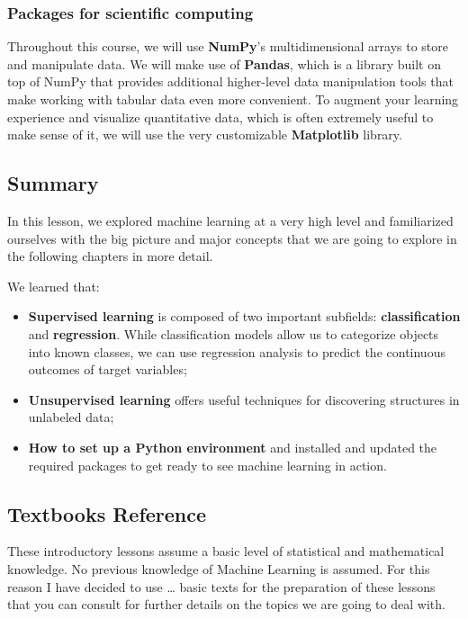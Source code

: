 \documentclass[11pt]{article}
\begin{document}
    \hypertarget{packages-for-scientific-computing}{%
\subsubsection{Packages for scientific
computing}\label{packages-for-scientific-computing}}

Throughout this course, we will use \textbf{NumPy}'s multidimensional
arrays to store and manipulate data. We will make use of
\textbf{Pandas}, which is a library built on top of NumPy that provides
additional higher-level data manipulation tools that make working with
tabular data even more convenient. To augment your learning experience
and visualize quantitative data, which is often extremely useful to make
sense of it, we will use the very customizable \textbf{Matplotlib}
library.

    \hypertarget{summary}{%
\subsection{Summary}\label{summary}}

In this lesson, we explored machine learning at a very high level and
familiarized ourselves with the big picture and major concepts that we
are going to explore in the following chapters in more detail.

We learned that:

\begin{itemize}
\item
  \textbf{Supervised learning} is composed of two important subfields:
  \textbf{classification} and \textbf{regression}. While classification
  models allow us to categorize objects into known classes, we can use
  regression analysis to predict the continuous outcomes of target
  variables;
\item
  \textbf{Unsupervised learning} offers useful techniques for
  discovering structures in unlabeled data;
\item
  \textbf{How to set up a Python environment} and installed and updated
  the required packages to get ready to see machine learning in action.
\end{itemize}

    \hypertarget{textbooks-reference}{%
\subsection{Textbooks Reference}\label{textbooks-reference}}

These introductory lessons assume a basic level of statistical and
mathematical knowledge. No previous knowledge of Machine Learning is
assumed. For this reason I have decided to use \ldots{} basic texts for
the preparation of these lessons that you can consult for further
details on the topics we are going to deal with.
\end{document}
